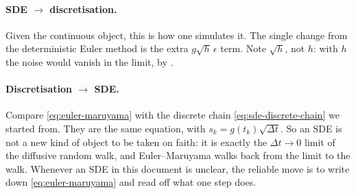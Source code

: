 \documentclass[11pt,a4paper]{report}
\theoremstyle{definition}
\theoremstyle{remark}
\begin{document}
\paragraph{SDE $\to$ discretisation.} Given the continuous object, this is
how one simulates it. The single change from the deterministic Euler method
is the extra $g\sqrt h\,\epsilon$ term. Note $\sqrt h$, not $h$: with $h$
the noise would vanish in the limit, by .

\paragraph{Discretisation $\to$ SDE.} Compare \eqref{eq:euler-maruyama} with
the discrete chain \eqref{eq:sde-discrete-chain} we started from. They are
the same equation, with $s_k = g(t_k)\sqrt{\Delta t}$. So an SDE is not a
new kind of object to be taken on faith: it is exactly the $\Delta t\to0$
limit of the diffusive random walk, and Euler--Maruyama walks back from the
limit to the walk. Whenever an SDE in this document is unclear, the reliable
move is to write down \eqref{eq:euler-maruyama} and read off what one step
does.
\end{document}
